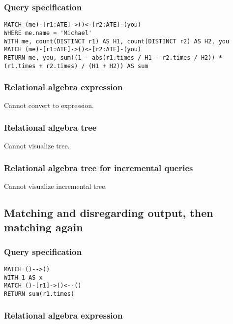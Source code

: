 \subsubsection*{Query specification}

\begin{lstlisting}
MATCH (me)-[r1:ATE]->()<-[r2:ATE]-(you)
WHERE me.name = 'Michael'
WITH me, count(DISTINCT r1) AS H1, count(DISTINCT r2) AS H2, you
MATCH (me)-[r1:ATE]->()<-[r2:ATE]-(you)
RETURN me, you, sum((1 - abs(r1.times / H1 - r2.times / H2)) * (r1.times + r2.times) / (H1 + H2)) AS sum
\end{lstlisting}

\subsubsection*{Relational algebra expression}

Cannot convert to expression.

\subsubsection*{Relational algebra tree}

Cannot visualize tree.

\subsubsection*{Relational algebra tree for incremental queries}

Cannot visualize incremental tree.

\subsection{Matching and disregarding output, then matching again}

\subsubsection*{Query specification}

\begin{lstlisting}
MATCH ()-->()
WITH 1 AS x
MATCH ()-[r1]->()<--()
RETURN sum(r1.times)
\end{lstlisting}

\subsubsection*{Relational algebra expression}

